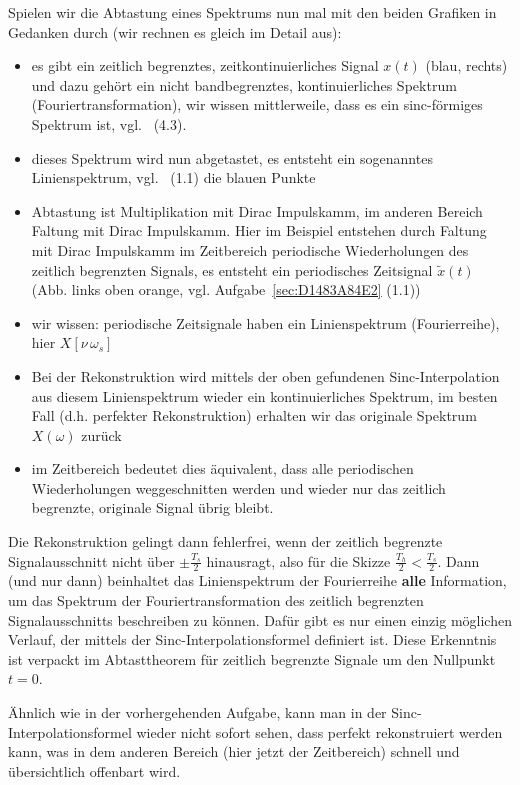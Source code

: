%
Spielen wir die Abtastung eines Spektrums nun mal mit den beiden Grafiken
in Gedanken durch (wir rechnen es gleich im Detail aus):
\begin{itemize}
  \item es gibt ein zeitlich begrenztes, zeitkontinuierliches Signal $x(t)$ (blau, rechts)
  und dazu gehört ein nicht bandbegrenztes, kontinuierliches Spektrum
  (Fouriertransformation), wir wissen mittlerweile, dass es ein sinc-förmiges Spektrum ist,
  vgl.~ (4.3).
  \item dieses Spektrum wird nun abgetastet, es entsteht ein sogenanntes
  Linienspektrum, vgl.~ (1.1) die blauen Punkte
  \item Abtastung ist Multiplikation mit Dirac Impulskamm, im anderen Bereich
  Faltung mit Dirac Impulskamm.
  Hier im Beispiel entstehen durch Faltung mit Dirac Impulskamm im Zeitbereich
  periodische Wiederholungen
  des zeitlich begrenzten Signals, es entsteht ein periodisches Zeitsignal
  $\tilde{x}(t)$ (Abb. links oben orange, vgl. Aufgabe~\ref{sec:D1483A84E2} (1.1))
  \item wir wissen: periodische Zeitsignale haben ein Linienspektrum (Fourierreihe), hier $X[\nu\,\omega_s]$
  \item Bei der Rekonstruktion wird mittels der oben gefundenen Sinc-Interpolation
  aus diesem Linienspektrum wieder ein kontinuierliches Spektrum, im besten
  Fall (d.h. perfekter Rekonstruktion) erhalten wir das originale Spektrum $X(\omega)$ zurück
  \item im Zeitbereich bedeutet dies äquivalent, dass alle periodischen
  Wiederholungen weggeschnitten werden und wieder nur das zeitlich begrenzte,
  originale Signal übrig bleibt.
\end{itemize}
Die Rekonstruktion gelingt dann fehlerfrei, wenn der zeitlich begrenzte
Signalausschnitt nicht über $\pm \frac{T_s}{2}$ hinausragt, also für die Skizze
$\frac{T_h}{2}<\frac{T_s}{2}$. Dann (und nur dann)
beinhaltet das Linienspektrum der Fourierreihe \textbf{alle} Information,
um das Spektrum der Fouriertransformation
des zeitlich begrenzten Signalausschnitts beschreiben zu können. Dafür gibt es
nur einen einzig möglichen Verlauf, der mittels der Sinc-Interpolationsformel
definiert ist. Diese Erkenntnis ist verpackt im Abtasttheorem für
zeitlich begrenzte Signale um den Nullpunkt $t=0$.

Ähnlich wie in der vorhergehenden Aufgabe, kann man in der Sinc-Interpolationsformel
wieder nicht sofort sehen, dass perfekt rekonstruiert werden kann, was in dem anderen
Bereich (hier jetzt der Zeitbereich) schnell und übersichtlich offenbart wird.

